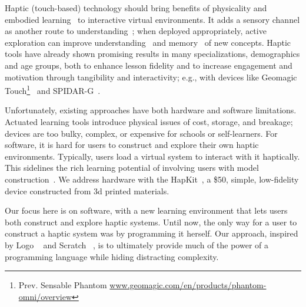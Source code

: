 Haptic (touch-based) technology should bring %
 benefits of physicality and embodied learning~\cite{dourish_where_2004} to interactive virtual environments. 
It adds a sensory channel as another route to understanding~\cite{calvert_crossmodal_1998}; when deployed appropriately, active exploration can improve understanding~\cite{martin_physically_2005} and memory~\cite{glenberg_activity_2004} of new concepts. 
Haptic tools have already shown promising results in many specializations, demographics and age groups, both
to enhance lesson fidelity 
and to increase engagement and motivation through tangibility and interactivity; e.g., with devices like Geomagic Touch\footnote{Prev. Sensable Phantom \url{www.geomagic.com/en/products/phantom-omni/overview}}~\cite{williams_implementation_2004} and SPIDAR-G~\cite{sato_haptic_2008}.

Unfortunately, %
existing approaches have %
both hardware and software limitations.
Actuated learning tools introduce physical issues of cost, storage, and breakage;
devices are  too bulky, complex, or expensive for schools or self-learners.
For software, it is hard for users to construct and explore their own haptic environments. Typically, users load a virtual system to interact with it haptically. This sidelines the rich learning potential of involving users with model construction~\cite{papert1980}.
We address hardware with the HapKit~\cite{Martinez2016}, a \$50, simple, low-fidelity device constructed from 3d printed materials.  

Our focus here is on software, with a new learning environment that lets users both construct and explore haptic systems. Until now, the only way for a user to construct a haptic system was by programming it herself. Our approach, inspired by Logo ~\cite{papert1980} and Scratch ~\cite{maloney2010}, is to ultimately %
provide much of the power of a programming language while hiding distracting complexity. 






